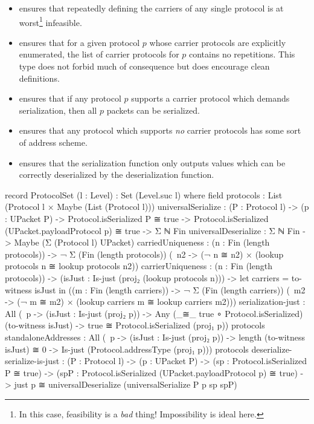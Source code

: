 \documentclass{report}
\begin{document}
\begin{itemize}
\begin{itemize}
	\item {}  ensures that repeatedly defining the carriers of any single protocol is at worst\footnote{In this case, feasibility is a \emph{bad} thing!  Impossibility is ideal here.} infeasible.
	\item {}  ensures that for a given protocol \(p\) whose carrier protocols are explicitly enumerated, the list of carrier protocols for \(p\) contains no repetitions.   This type does not forbid much of consequence but does encourage clean definitions.
	\item {}  ensures that if any protocol \(p\) supports a carrier protocol which demands serialization, then all \(p\) packets can be serialized.
	\item {}  ensures that any protocol which supports \emph{no} carrier protocols has some sort of address scheme.
	\item {}  ensures that the serialization function only outputs values which can be correctly deserialized by the deserialization function.
\end{itemize}

\begin{code}
  record ProtocolSet (l : Level) : Set (Level.suc l) where
    field
      protocols : List (Protocol l × Maybe (List (Protocol l)))
      universalSerialize :
        (P : Protocol l) ->
        (p : UPacket P) ->
        Protocol.isSerialized P ≅ true ->
        Protocol.isSerialized (UPacket.payloadProtocol p) ≅ true ->
        Σ ℕ Fin
      universalDeserialize : Σ ℕ Fin -> Maybe (Σ (Protocol l) UPacket)
      carriedUniqueness :
        (n : Fin (length protocols)) ->
        ¬ Σ (Fin (length protocols))
            (\ n2 -> (¬ n ≅ n2) ×
                     (lookup protocols n ≅ lookup protocols n2))
      carrierUniqueness :
        (n : Fin (length protocols)) ->
        (isJust : Is-just (proj₂ (lookup protocols n))) ->
        let carriers = to-witness isJust in
        ((m : Fin (length carriers)) ->
         ¬ Σ (Fin (length carriers))
             (\ m2 -> (¬ m ≅ m2) ×
                      (lookup carriers m ≅ lookup carriers m2)))
      serialization-just :
        All (\ p -> (isJust : Is-just (proj₂ p))
                 -> Any (_≅_ true ∘ Protocol.isSerialized)
                        (to-witness isJust)
                 -> true ≅ Protocol.isSerialized (proj₁ p))
            protocols
      standaloneAddresses :
        All (\ p -> (isJust : Is-just (proj₂ p))
                 -> length (to-witness isJust) ≅ 0
                 -> Is-just (Protocol.addressType (proj₁ p)))
            protocols
      deserialize-serialize-is-just :
        (P : Protocol l) ->
        (p : UPacket P) ->
        (sp : Protocol.isSerialized P ≅ true) ->
        (spP : Protocol.isSerialized (UPacket.payloadProtocol p) ≅ true) ->
        just p ≅
        universalDeserialize (universalSerialize P p sp spP)
\end{code}


\end{itemize}
\end{document}
